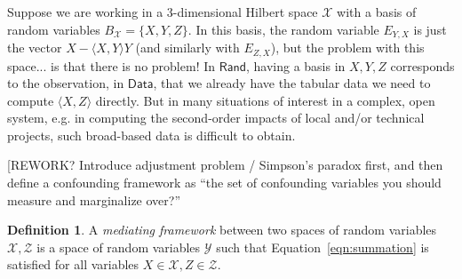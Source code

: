 \documentclass{article}
\theoremstyle{definition}
\newtheorem{definition}[theorem]{Definition}
\newcommand{\redout}[1]{{\color{red}#1}}
\newcommand{\Cat}[1]{\mathsf{#1}}
\def\Rand{\Cat{Rand}}
\def\Data{\Cat{Data}}
\begin{document}
Suppose we are working in a 3-dimensional Hilbert space $\mathcal{X}$ with a basis of random variables $B_\mathcal{X}=\{ X, Y, Z\}$. In this basis, the random variable $E_{Y,X}$ is just the vector $X - \langle X,Y \rangle Y$ (and similarly with $E_{Z,X}$), but the problem with this space... is that there is no problem! In $\Rand$, having a basis in $X,Y,Z$ corresponds to the observation, in $\Data$, that we already have the tabular data we need to compute $\langle X, Z \rangle$ directly. But in many situations of interest in a complex, open system, e.g. in computing the second-order impacts of local and/or technical projects, such broad-based data is difficult to obtain. 

\redout{[REWORK? Introduce adjustment problem / Simpson's paradox first, and then define a confounding framework as ``the set of confounding variables you should measure and marginalize over?''}

\begin{definition}
A \emph{mediating framework} between two spaces of random variables $\mathcal{X}, \mathcal{Z}$ is a space of random variables $\mathcal{Y}$ such that Equation~\ref{eqn:summation} is satisfied for all variables $X \in \mathcal{X}, Z \in \mathcal{Z}$. %
\end{definition}


\end{document}
